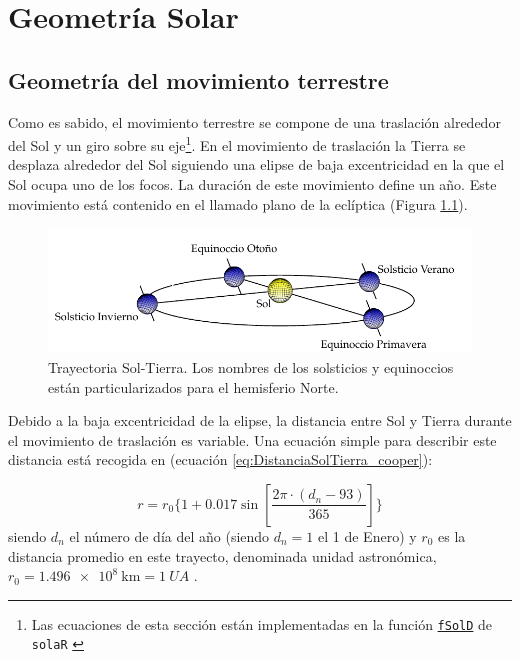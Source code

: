 
\chapter{Geometría Solar\label{cha:Geometria Solar}}


\section{Geometría del movimiento terrestre}

Como es sabido, el movimiento terrestre se compone de una traslación
alrededor del Sol y un giro sobre su eje\footnote{Las ecuaciones de
  esta sección están implementadas en la función \href{http://search.r-project.org/R/library/solaR/html/fSolD.html}{\texttt{fSolD}} de \texttt{solaR} \cite{Perpinan2012b}}. En el movimiento de traslación
la Tierra se desplaza alrededor del Sol siguiendo una elipse de baja
excentricidad en la que el Sol ocupa uno de los focos. La duración
de este movimiento define un año. Este movimiento está contenido en
el llamado plano de la eclíptica (Figura
\ref{fig:Trayectoria-Sol-Tierra}).


\begin{figure}
\includegraphics{../figs/PlanoEcliptica}

\caption{Trayectoria Sol-Tierra. Los nombres de los solsticios y equinoccios
están particularizados para el hemisferio Norte.\label{fig:Trayectoria-Sol-Tierra}}

\end{figure}



Debido a la baja excentricidad de la elipse, la distancia entre Sol
y Tierra durante el movimiento de traslación es variable. Una ecuación
simple para describir este distancia está recogida en
\cite{Cooper1969} (ecuación \ref{eq:DistanciaSolTierra_cooper}):

\begin{equation}
r=r_{0}\{1+0.017\sin[\frac{2\pi\cdot(d_{n}-93)}{365}]\}
\label{eq:DistanciaSolTierra_cooper}
\end{equation}
siendo $d_{n}$ el número de día del año (siendo $d_{n}=1$ el 1 de
Enero) y $r_{0}$ es la distancia promedio en este trayecto, denominada
unidad astronómica,
$r_{0}=\SI{1.496e8}{\kilo\metre}=\SI{1}{UA}$
. 

